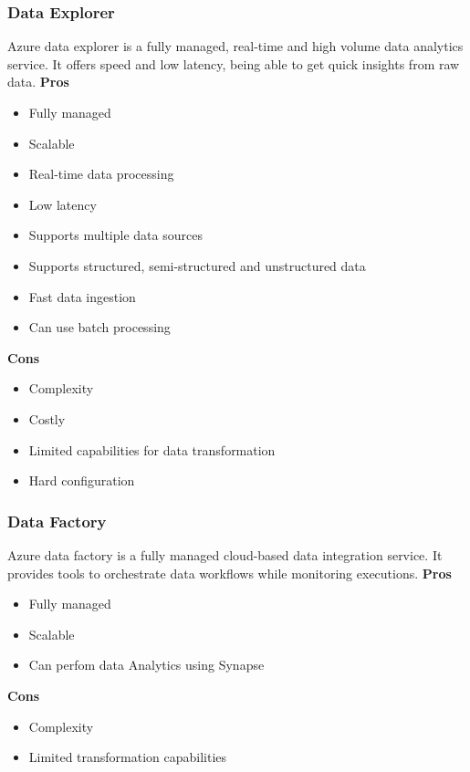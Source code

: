         \subsubsection{Data Explorer}
        \label{azure:data-explorer}
        Azure data explorer is a fully managed, real-time and high volume data analytics service. 
        It offers speed and low latency, being able to get quick insights from raw data.
        \textbf{Pros}
        \begin{itemize}
            \item Fully managed
            \item Scalable
            \item Real-time data processing
            \item Low latency
            \item Supports multiple data sources
            \item Supports structured, semi-structured and unstructured data
            \item Fast data ingestion
            \item Can use batch processing
        \end{itemize}
        \textbf{Cons}
        \begin{itemize}
            \item Complexity
            \item Costly
            \item Limited capabilities for data transformation
            \item Hard configuration
        \end{itemize}

        \subsubsection{Data Factory}
        \label{azure:data-factory}
        Azure data factory is a fully managed cloud-based data integration service.
        It provides tools to orchestrate data workflows while monitoring executions.
        \textbf{Pros}
        \begin{itemize}
            \item Fully managed
            \item Scalable
            \item Can perfom data Analytics using Synapse
        \end{itemize}
        \textbf{Cons}
        \begin{itemize}
            \item Complexity
            \item Limited transformation capabilities
        \end{itemize}

